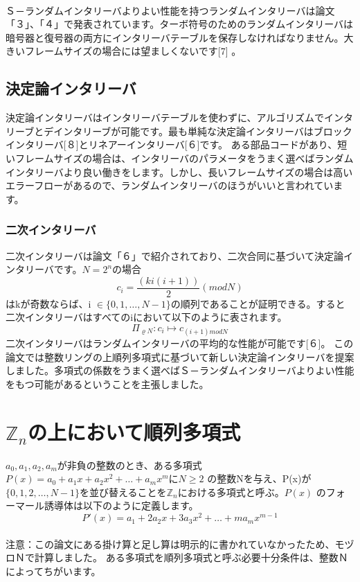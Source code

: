 \documentclass[20 pts]{article}
\begin{document}
\paragraph{}
Ｓ－ランダムインタリーバよりよい性能を持つランダムインタリーバは論文「３」、「４」で発表されています。ターボ符号のためのランダムインタリーバは暗号器と復号器の両方にインタリーバテーブルを保存しなければなりません。大きいフレームサイズの場合には望ましくないです[7] 。

\subsection{決定論インタリーバ}
決定論インタリーバはインタリーバテーブルを使わずに、アルゴリズムでインタリーブとデインタリーブが可能です。最も単純な決定論インタリーバはブロックインタリーバ[８]とリネアーインタリーバ[６]です。
ある部品コードがあり、短いフレームサイズの場合は、インタリーバのパラメータをうまく選べばランダムインタリーバより良い働きをします。しかし、長いフレームサイズの場合は高いエラーフローがあるので、ランダムインタリーバのほうがいいと言われています。

\subsubsection{二次インタリーバ}
二次インタリーバは論文「６」で紹介されており、二次合同に基づいて決定論インタリーバです。$N=2^n$の場合
$$c_i=\frac{(ki(i+1))}{2}(modN)$$はkが奇数ならば、i $\in\{0,1,…,N-1\}$の順列であることが証明できる。すると二次インタリーバはすべてのiにおいて以下のように表されます。
$$\Pi_{\varrho{N}}:c_i \mapsto c_{(i+1)modN}$$
二次インタリーバはランダムインタリーバの平均的な性能が可能です[６]。
この論文では整数リングの上順列多項式に基づいて新しい決定論インタリーバを提案しました。多項式の係数をうまく選べばＳ－ランダムインタリーバよりよい性能をもつ可能があるということを主張しました。

\section{$\mathbb{Z}_n$の上において順列多項式}
$a_0,a_1, a_2, a_m$が非負の整数のとき、ある多項式$P(x)=a_0+a_1x+a_2x^2+…+a_mx^m$に$N\geq 2$ の整数Nを与え、P(x)が
 $\{0,1,2,…,N-1\}$を並び替えることを$\mathbb{Z}_n$における多項式と呼ぶ。$P(x)$ のフォーマール誘導体は以下のように定義します。 
  \begin{equation} P'(x)=a_1+2a_2x+3a_3x^2+…+ma_mx^{m-1} \end{equation}
  \paragraph{}
  注意：この論文にある掛け算と足し算は明示的に書かれていなかったため、モヅロＮで計算しました。
ある多項式を順列多項式と呼ぶ必要十分条件は、整数Ｎによってちがいます。
\end{document}
